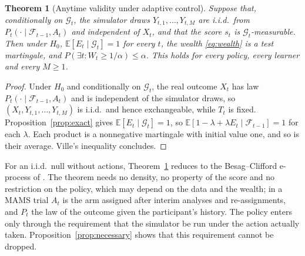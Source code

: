 \documentclass[12pt]{article}
\newcommand{\E}{\mathbb{E}}
\newcommand{\F}{\mathcal{F}}
\newcommand{\G}{\mathcal{G}}
\newtheorem{theorem}{Theorem}
\theoremstyle{remark}
\begin{document}
\begin{theorem}[Anytime validity under adaptive control]\label{thm:valid}
Suppose that, conditionally on $\G_t$, the simulator draws
$Y_{t,1}, \ldots, Y_{t,M}$ are i.i.d.\ from $P_t(\cdot \mid \F_{t-1}, A_t)$ and
independent of $X_t$, and that the score $s_t$ is $\G_t$-measurable. Then
under $H_0$, $\E[E_t \mid \G_t] = 1$ for every $t$, the wealth
\eqref{eq:wealth} is a test martingale, and
$P(\exists t: W_t \ge 1/\alpha) \le \alpha$. This holds for every policy,
every learner and every $M \ge 1$.
\end{theorem}

\begin{proof}
Under $H_0$ and conditionally on $\G_t$, the real outcome $X_t$ has law
$P_t(\cdot \mid \F_{t-1}, A_t)$ and is independent of the simulator draws, so
$(X_t, Y_{t,1}, \ldots, Y_{t,M})$ is i.i.d.\ and hence exchangeable, while
$T_t$ is fixed. Proposition~\ref{prop:exact} gives
$\E[E_t \mid \G_t] = 1$, so $\E[1 - \lambda + \lambda E_t \mid \F_{t-1}] = 1$
for each $\lambda$. Each product is a nonnegative martingale with initial
value one, and so is their average. Ville's inequality concludes.
\end{proof}

For an i.i.d.\ null without actions, Theorem~\ref{thm:valid} reduces to the
Besag--Clifford e-process of \citet[Proposition~6]{dombowsky2026besag}. The theorem needs no density, no property of the score and no restriction on the policy, which may depend on the data and the wealth; in a MAMS trial $A_t$ is the arm assigned after interim analyses and re-assignments, and $P_t$ the law of the outcome given the participant's history. The policy
enters only through the requirement that the simulator be run under the action
actually taken. Proposition~\ref{prop:necessary} shows that this
requirement cannot be dropped.
\end{document}
